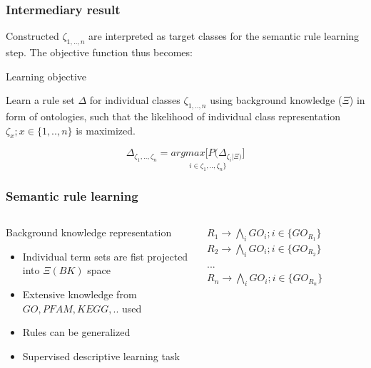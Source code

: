 \documentclass{beamer}
\begin{document}
\begin{frame}\frametitle{Intermediary result}

 Constructed $\zeta_{1,..,n}$  are interpreted as target classes for the semantic rule learning step. The objective function thus becomes:

  \begin{alertblock}{Learning objective}

    Learn a rule set $\Delta$  for individual classes $\zeta_{1,..,n}$ using background knowledge ($\Xi$) in form of ontologies, such that the likelihood of individual class representation $\zeta_{x};x \in \{1,..,n\}$ is maximized.

    \begin{equation}
      \Delta_{\zeta_{1},..,\zeta_{n}} = \underset{i \in \zeta_{1},..,\zeta_{n}\}}{argmax \Big[P(
        \Delta_{\zeta_{i}|\Xi)} \Big]}
    \end{equation}
    
    \end{alertblock}
  
  \end{frame}

  \begin{frame}\frametitle{Semantic rule learning}

      \begin{columns}
    \begin{column}{0.5\textwidth}

  \begin{block}{Background knowledge representation}
    \begin{itemize}

    \item Individual term sets are fist projected into $\Xi(BK)$ space
    \item Extensive knowledge from $GO,PFAM, KEGG,..$ used
    \item Rules can be generalized
    \item Supervised descriptive learning task
      
    \end{itemize}
  \end{block}
      \end{column}
      \begin{column}{0.5\textwidth}  %
      \begin{center}
        $R_{1} \rightarrow \bigwedge_{i}GO_{i}; i \in \{GO_{R_{1}}\}$
        $R_{2} \rightarrow \bigwedge_{i}GO_{i}; i \in \{GO_{R_{2}}\}$\\
        $...$\\
        \medskip
        $R_{n} \rightarrow \bigwedge_{i}GO_{i}; i \in \{GO_{R_{n}}\}$
      \end{center}
    \end{column}
    \end{columns}

  \end{frame}
\end{document}
